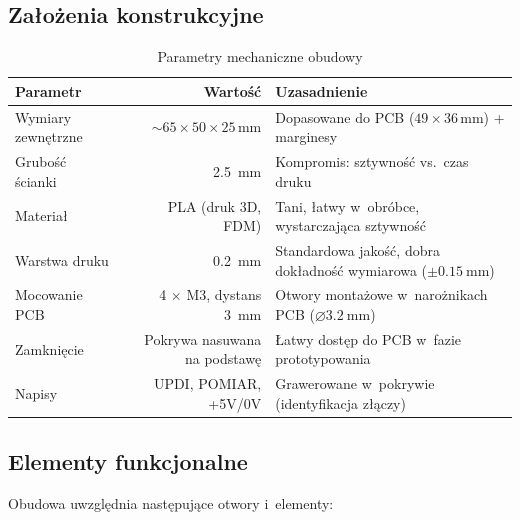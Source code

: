 \documentclass[a4paper,11pt]{article}
\begin{document}
	\subsection{Założenia konstrukcyjne}
	
	\begin{table}[H]
		\centering
		\caption{Parametry mechaniczne obudowy}
		\label{tab:obudowa_params}
		\begin{tabularx}{\textwidth}{l r X}
			\toprule
			\textbf{Parametr} & \textbf{Wartość} & \textbf{Uzasadnienie} \\
			\midrule
			Wymiary zewnętrzne & ${\sim}65 \times 50 \times 25$\,mm
			& Dopasowane do PCB ($49 \times 36$\,mm) + marginesy \\
			Grubość ścianki & \SI{2,5}{\milli\metre}
			& Kompromis: sztywność vs.\ czas druku \\
			Materiał & PLA (druk 3D, FDM)
			& Tani, łatwy w~obróbce, wystarczająca sztywność \\
			Warstwa druku & \SI{0,2}{\milli\metre}
			& Standardowa jakość, dobra dokładność wymiarowa ($\pm\SI{0,15}{\milli\metre}$) \\
			Mocowanie PCB & 4 $\times$ M3, dystans \SI{3}{\milli\metre}
			& Otwory montażowe w~narożnikach PCB ($\varnothing\SI{3,2}{\milli\metre}$) \\
			Zamknięcie & Pokrywa nasuwana na podstawę
			& Łatwy dostęp do PCB w~fazie prototypowania \\
			Napisy & UPDI, POMIAR, +5V/0V
			& Grawerowane w~pokrywie (identyfikacja złączy) \\
			\bottomrule
		\end{tabularx}
	\end{table}
	
	\subsection{Elementy funkcjonalne}
	
	Obudowa uwzględnia następujące otwory i~elementy:
	
\end{document}
